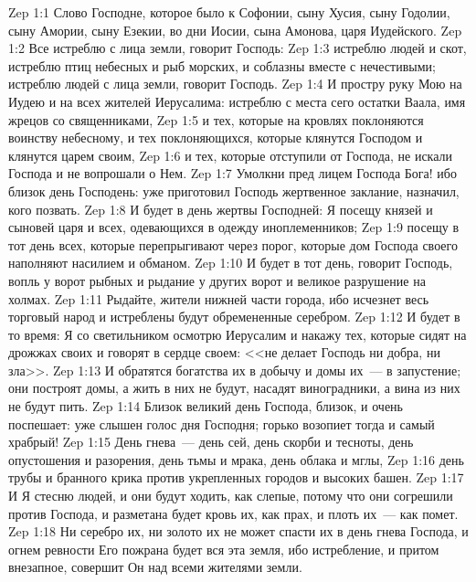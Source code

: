 \vs Zep 1:1 Слово Господне, которое было к Софонии, сыну Хусия, сыну Годолии, сыну Амории, сыну Езекии, во дни Иосии, сына Амонова, царя Иудейского.
\rsbpar\vs Zep 1:2 Все истреблю с лица земли, говорит Господь:
\vs Zep 1:3 истреблю людей и скот, истреблю птиц небесных и рыб морских, и соблазны вместе с нечестивыми; истреблю людей с лица земли, говорит Господь.
\vs Zep 1:4 И простру руку Мою на Иудею и на всех жителей Иерусалима: истреблю с места сего остатки Ваала, имя жрецов со священниками,
\vs Zep 1:5 и тех, которые на кровлях поклоняются воинству небесному, и тех поклоняющихся, которые клянутся Господом и клянутся царем своим,
\vs Zep 1:6 и тех, которые отступили от Господа, не искали Господа и не вопрошали о Нем.
\vs Zep 1:7 Умолкни пред лицем Господа Бога! ибо близок день Господень: уже приготовил Господь жертвенное заклание, назначил, кого позвать.
\vs Zep 1:8 И будет в день жертвы Господней: Я посещу князей и сыновей царя и всех, одевающихся в одежду иноплеменников;
\vs Zep 1:9 посещу в тот день всех, которые перепрыгивают через порог, которые дом Господа своего наполняют насилием и обманом.
\vs Zep 1:10 И будет в тот день, говорит Господь, вопль у ворот рыбных и рыдание у других ворот и великое разрушение на холмах.
\vs Zep 1:11 Рыдайте, жители нижней части города, ибо исчезнет весь торговый народ и истреблены будут обремененные серебром.
\vs Zep 1:12 И будет в то время: Я со светильником осмотрю Иерусалим и накажу тех, которые сидят на дрожжах своих и говорят в сердце своем: <<не делает Господь ни добра, ни зла>>.
\vs Zep 1:13 И обратятся богатства их в добычу и домы их~--- в запустение; они построят домы, а жить в них не будут, насадят виноградники, а вина из них не будут пить.
\rsbpar\vs Zep 1:14 Близок великий день Господа, близок, и очень поспешает: уже слышен голос дня Господня; горько возопиет тогда и самый храбрый!
\vs Zep 1:15 День гнева~--- день сей, день скорби и тесноты, день опустошения и разорения, день тьмы и мрака, день облака и мглы,
\vs Zep 1:16 день трубы и бранного крика против укрепленных городов и высоких башен.
\vs Zep 1:17 И Я стесню людей, и они будут ходить, как слепые, потому что они согрешили против Господа, и разметана будет кровь их, как прах, и плоть их~--- как помет.
\vs Zep 1:18 Ни серебро их, ни золото их не может спасти их в день гнева Господа, и огнем ревности Его пожрана будет вся эта земля, ибо истребление, и притом внезапное, совершит Он над всеми жителями земли.
